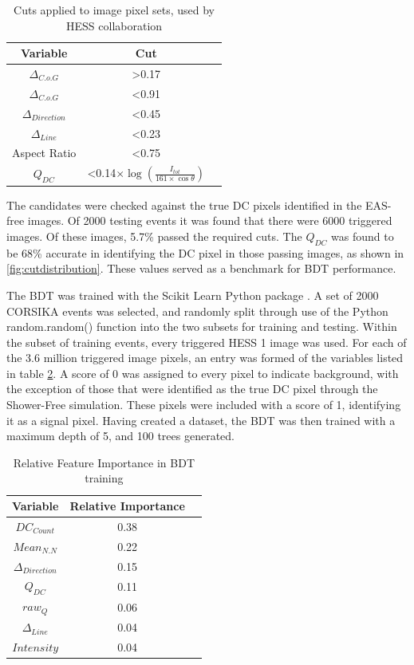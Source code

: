 \documentclass[]{article}
\begin{document}
\begin{table}[h!]
  \centering
  \caption{Cuts applied to image pixel sets, used by HESS collaboration \cite{hess07}}
  \label{tab:table1}
  \begin{tabular}{ccc}
    \toprule
    Variable & Cut\\
    \midrule
     $ \Delta_{C.o.G}$ & \textgreater 0.17 \\
     $ \Delta_{C.o.G}$ & \textless 0.91 \\
     $\Delta_{Direction}$ & \textless 0.45 \\
     $\Delta_{Line}$ & \textless 0.23 \\
     Aspect Ratio & \textless 0.75 \\
     $Q_{DC}$ & \textless 0.14$ \times \log(\frac{I_{tot}}{161 \times \cos \theta})$ \\
    \bottomrule
  \end{tabular}
\end{table}

The candidates were checked against the true DC pixels identified in the EAS-free images. Of 2000 testing events it was found that there were 6000 triggered images. Of these images, 5.7\% passed the required cuts. The $Q_{DC}$ was found to be 68\% accurate in identifying the DC pixel in those passing images, as shown in \ref{fig:cutdistribution}. These values served as a benchmark for BDT performance. 

The BDT was trained with the Scikit Learn Python package \cite{scikit-learn}. A set of 2000 CORSIKA events was selected, and randomly split through use of the Python random.random() function into the two subsets for training and testing. Within the subset of training events, every triggered HESS 1 image was used. For each of the 3.6 million triggered image pixels, an entry was formed of the variables listed in table \ref{tab:table2}. A score of 0 was assigned to every pixel to indicate background, with the exception of those that were identified as the true DC pixel through the Shower-Free simulation. These pixels were included with a score of 1, identifying it as a signal pixel. Having created a dataset, the BDT was then trained with a maximum depth of 5, and 100 trees generated.

\begin{table}[h!]
  \centering
  \caption{Relative Feature Importance in BDT training}
  \label{tab:table2}
  \begin{tabular}{ccc}
    \toprule
    Variable & Relative Importance\\
    \midrule
    $DC_{Count}$ & 0.38\\
    $Mean_{N.N}$ & 0.22\\
    $\Delta_{Direction}$ & 0.15\\
    $Q_{DC}$ & 0.11\\
    $raw_{Q}$ & 0.06\\
    $\Delta_{Line}$ & 0.04\\
    $Intensity$ & 0.04\\
    \bottomrule
  \end{tabular}
\end{table}
\end{document}
